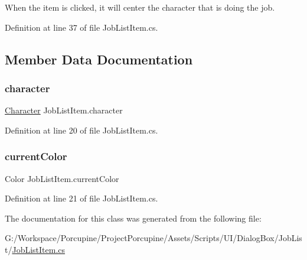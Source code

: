 When the item is clicked, it will center the character that is doing the job. 



Definition at line 37 of file Job\+List\+Item.\+cs.



\subsection{Member Data Documentation}
\mbox{\label{class_job_list_item_ac66d008cebd09da086292835db8b6ca7}} 
\subsubsection{\texorpdfstring{character}{character}}
{\footnotesize\ttfamily \hyperlink{class_project_porcupine_1_1_entities_1_1_character}{Character} Job\+List\+Item.\+character}



Definition at line 20 of file Job\+List\+Item.\+cs.

\mbox{\label{class_job_list_item_ac7b71b8cf12a4400c0b24ca0b318c0c7}} 
\subsubsection{\texorpdfstring{current\+Color}{currentColor}}
{\footnotesize\ttfamily Color Job\+List\+Item.\+current\+Color}



Definition at line 21 of file Job\+List\+Item.\+cs.



The documentation for this class was generated from the following file\+:\begin{DoxyCompactItemize}
\item 
G\+:/\+Workspace/\+Porcupine/\+Project\+Porcupine/\+Assets/\+Scripts/\+U\+I/\+Dialog\+Box/\+Job\+List/\hyperlink{_job_list_item_8cs}{Job\+List\+Item.\+cs}\end{DoxyCompactItemize}
